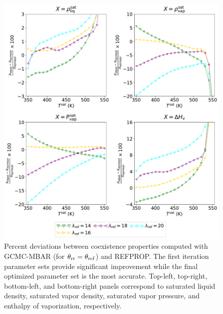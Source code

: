 \documentclass[journal=jced,manuscript=article]{achemso}
\begin{document}
\begin{figure}[htb!]
	\centering
		\includegraphics[width=6.4in]{CYC6_deviations_iterations.pdf}
	\caption{Percent deviations between coexistence properties computed with GCMC-MBAR (for $\theta_{\rm rr} = \theta_{\rm ref}$) and REFPROP. The first iteration parameter sets provide significant improvement while the final optimized parameter set is the most accurate. Top-left, top-right, bottom-left, and bottom-right panels correspond to saturated liquid density, saturated vapor density, saturated vapor pressure, and enthalpy of vaporization, respectively.}
	\label{fig: VLE cyclohexane}
\end{figure}
\end{document}
